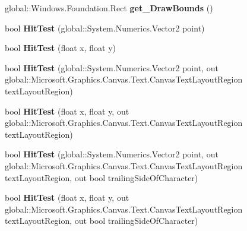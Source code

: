 \begin{DoxyCompactItemize}
global\+::\+Windows.\+Foundation.\+Rect {\bfseries get\+\_\+\+Draw\+Bounds} ()
\item 
\mbox{\label{interface_microsoft_1_1_graphics_1_1_canvas_1_1_text_1_1_i_canvas_text_layout_a2151faef30105a2fa20e7fc83746089c}} 
bool {\bfseries Hit\+Test} (global\+::\+System.\+Numerics.\+Vector2 point)
\item 
\mbox{\label{interface_microsoft_1_1_graphics_1_1_canvas_1_1_text_1_1_i_canvas_text_layout_a25b988998378e67ba732e8d3e69b1f51}} 
bool {\bfseries Hit\+Test} (float x, float y)
\item 
\mbox{\label{interface_microsoft_1_1_graphics_1_1_canvas_1_1_text_1_1_i_canvas_text_layout_adeb4ec733847627d081e70843cf372ec}} 
bool {\bfseries Hit\+Test} (global\+::\+System.\+Numerics.\+Vector2 point, out global\+::\+Microsoft.\+Graphics.\+Canvas.\+Text.\+Canvas\+Text\+Layout\+Region text\+Layout\+Region)
\item 
\mbox{\label{interface_microsoft_1_1_graphics_1_1_canvas_1_1_text_1_1_i_canvas_text_layout_a1620bdefefce95ef2ae5525645e72e66}} 
bool {\bfseries Hit\+Test} (float x, float y, out global\+::\+Microsoft.\+Graphics.\+Canvas.\+Text.\+Canvas\+Text\+Layout\+Region text\+Layout\+Region)
\item 
\mbox{\label{interface_microsoft_1_1_graphics_1_1_canvas_1_1_text_1_1_i_canvas_text_layout_ae4c70cf259e0ada5180a328f0e176122}} 
bool {\bfseries Hit\+Test} (global\+::\+System.\+Numerics.\+Vector2 point, out global\+::\+Microsoft.\+Graphics.\+Canvas.\+Text.\+Canvas\+Text\+Layout\+Region text\+Layout\+Region, out bool trailing\+Side\+Of\+Character)
\item 
\mbox{\label{interface_microsoft_1_1_graphics_1_1_canvas_1_1_text_1_1_i_canvas_text_layout_a457ec60b8296c34aec79cbe740e5f6b3}} 
bool {\bfseries Hit\+Test} (float x, float y, out global\+::\+Microsoft.\+Graphics.\+Canvas.\+Text.\+Canvas\+Text\+Layout\+Region text\+Layout\+Region, out bool trailing\+Side\+Of\+Character)

\end{DoxyCompactItemize}
